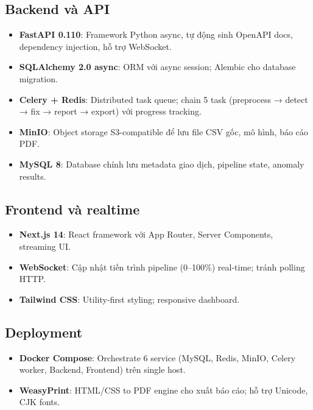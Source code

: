 \subsection{Backend và API}

\begin{itemize}
  \item \textbf{FastAPI 0.110}: Framework Python async, tự động sinh OpenAPI docs, dependency injection, hỗ trợ WebSocket.
  \item \textbf{SQLAlchemy 2.0 async}: ORM với async session; Alembic cho database migration.
  \item \textbf{Celery + Redis}: Distributed task queue; chain 5 task (preprocess → detect → fix → report → export) với progress tracking.
  \item \textbf{MinIO}: Object storage S3-compatible để lưu file CSV gốc, mô hình, báo cáo PDF.
  \item \textbf{MySQL 8}: Database chính lưu metadata giao dịch, pipeline state, anomaly results.
\end{itemize}

\subsection{Frontend và realtime}

\begin{itemize}
  \item \textbf{Next.js 14}: React framework với App Router, Server Components, streaming UI.
  \item \textbf{WebSocket}: Cập nhật tiến trình pipeline (0--100\%) real-time; tránh polling HTTP.
  \item \textbf{Tailwind CSS}: Utility-first styling; responsive dashboard.
\end{itemize}

\subsection{Deployment}

\begin{itemize}
  \item \textbf{Docker Compose}: Orchestrate 6 service (MySQL, Redis, MinIO, Celery worker, Backend, Frontend) trên single host.
  \item \textbf{WeasyPrint}: HTML/CSS to PDF engine cho xuất báo cáo; hỗ trợ Unicode, CJK fonts.
\end{itemize}

